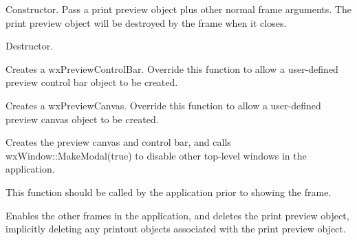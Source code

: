 Constructor. Pass a print preview object plus other normal frame arguments.
The print preview object will be destroyed by the frame when it closes.

\label{wxpreviewframedtor}


Destructor. 

\label{wxpreviewframecreatecontrolbar}


Creates a wxPreviewControlBar. Override this function to allow
a user-defined preview control bar object to be created.

\label{wxpreviewframecreatecanvas}


Creates a wxPreviewCanvas. Override this function to allow
a user-defined preview canvas object to be created.

\label{wxpreviewframeinitialize}


Creates the preview canvas and control bar, and calls
wxWindow::MakeModal(true) to disable other top-level windows
in the application.

This function should be called by the application prior to
showing the frame.

\label{wxpreviewframeonclosewindow}


Enables the other frames in the application, and deletes the print preview
object, implicitly deleting any printout objects associated with the print
preview object.

